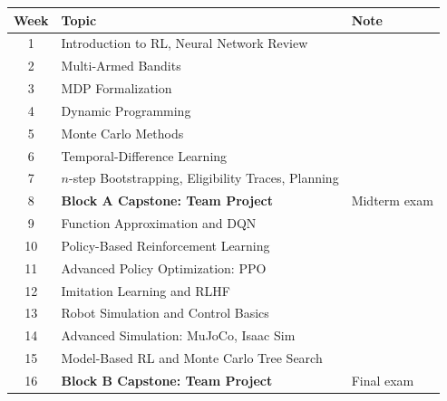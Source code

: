 \documentclass[11pt]{article}
\begin{document}
\begin{center}
\small
\begin{tabular}{@{}clp{5cm}@{}}
\toprule
Week & Topic & Note \\
\midrule
1 & Introduction to RL, Neural Network Review & \\
2 & Multi-Armed Bandits & \\
3 & MDP Formalization & \\
4 & Dynamic Programming & \\
5 & Monte Carlo Methods & \\
6 & Temporal-Difference Learning & \\
7 & $n$-step Bootstrapping, Eligibility Traces, Planning & \\
8 & \textbf{Block A Capstone: Team Project} & Midterm exam \\
9 & Function Approximation and DQN & \\
10 & Policy-Based Reinforcement Learning & \\
11 & Advanced Policy Optimization: PPO & \\
12 & Imitation Learning and RLHF & \\
13 & Robot Simulation and Control Basics & \\
14 & Advanced Simulation: MuJoCo, Isaac Sim & \\
15 & Model-Based RL and Monte Carlo Tree Search & \\
16 & \textbf{Block B Capstone: Team Project} & Final exam \\
\bottomrule
\end{tabular}
\end{center}

\vspace{4pt}
\end{document}
